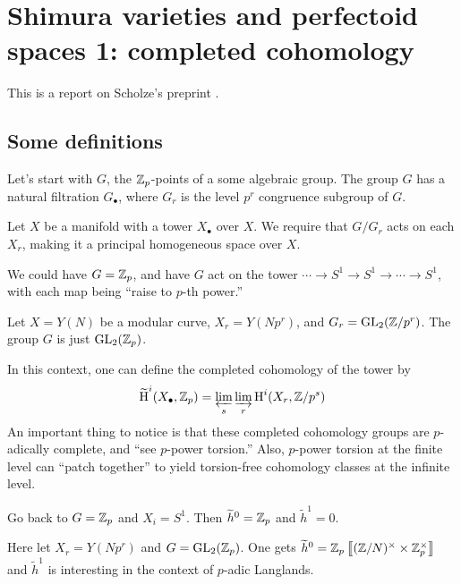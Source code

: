 
\section{Shimura varieties and perfectoid spaces 1: completed cohomology}





This is a report on Scholze's preprint \cite{sc13b}. 



\subsection{Some definitions}


Let's start with $G$, the $\mathbb{Z}_p$-points of a some algebraic group. The group 
$G$ has a natural filtration $G_\bullet$, where $G_r$ is the level $p^r$ congruence 
subgroup of $G$. 

Let $X$ be a manifold with a tower $X_\bullet$ over $X$. We require that 
$G/G_r$ acts on each $X_r$, making it a principal homogeneous space over $X$. 

\begin{example}
We could have $G=\mathbb{Z}_p$, and have $G$ act on the tower 
$\cdots \to S^1 \to S^1 \to \cdots \to S^1$, with each map being ``raise to 
$p$-th power.'' 
\end{example}

\begin{example}
Let $X=Y(N)$ be a modular curve, $X_r=Y(N p^r)$, and 
$G_r=\operatorname{GL}_2(\mathbb{Z}/p^r)$. The group $G$ is just $\operatorname{GL}_2(\mathbb{Z}_p)$. 
\end{example}

In this context, one can define the completed cohomology of the tower by 
\[
  \widetilde {\operatorname{H}}^i(X_\bullet,\mathbb{Z}_p) = \varprojlim_s \varinjlim_r \operatorname{H}^i(X_r,\mathbb{Z}/p^s)
\]
An important thing to notice is that these completed cohomology groups are 
$p$-adically complete, and ``see $p$-power torsion.'' Also, $p$-power torsion 
at the finite level can ``patch together'' to yield torsion-free cohomology 
classes at the infinite level. 

\begin{example}
Go back to $G=\mathbb{Z}_p$ and $X_i=S^1$. Then $\widetilde h^0=\mathbb{Z}_p$ and 
$\widetilde h^1=0$. 
\end{example}

\begin{example}
Here let $X_r=Y(N p^r)$ and $G=\operatorname{GL}_2(\mathbb{Z}_p)$. One gets 
$\widetilde h^0=\mathbb{Z}_p\left\llbracket {(\mathbb{Z}/N)^\times \times \mathbb{Z}_p^\times} \right\rrbracket$ and 
$\widetilde h^1$ is interesting in the context of $p$-adic Langlands. 
\end{example}

